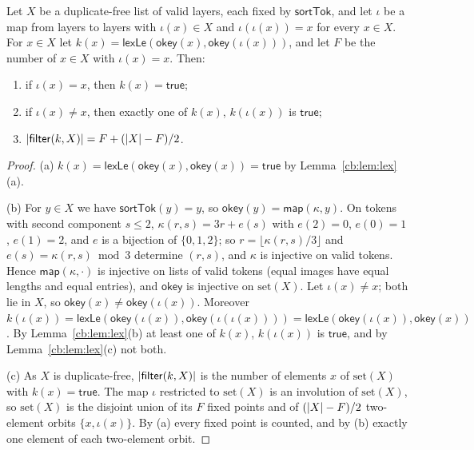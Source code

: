 \begin{lemma}\label{cb:lem:orbits}
Let $X$ be a duplicate-free list of valid layers, each fixed by $\mathsf{sortTok}$, and let $\iota$ be a map from
layers to layers with $\iota(x)\in X$ and $\iota(\iota(x))=x$ for every $x\in X$. For $x\in X$ let
$k(x)=\mathsf{lexLe}(\mathsf{okey}(x),\mathsf{okey}(\iota(x)))$, and let $F$ be the number of $x\in X$ with
$\iota(x)=x$. Then:
\begin{enumerate}[label=(\alph*)]
\item if $\iota(x)=x$, then $k(x)=\mathsf{true}$;
\item if $\iota(x)\ne x$, then exactly one of $k(x)$, $k(\iota(x))$ is $\mathsf{true}$;
\item $\lvert\mathsf{filter}(k,X)\rvert=F+(\lvert X\rvert-F)/2$.
\end{enumerate}
\end{lemma}

\begin{proof}
(a) $k(x)=\mathsf{lexLe}(\mathsf{okey}(x),\mathsf{okey}(x))=\mathsf{true}$ by Lemma~\ref{cb:lem:lex}(a).

(b) For $y\in X$ we have $\mathsf{sortTok}(y)=y$, so $\mathsf{okey}(y)=\mathsf{map}(\kappa,y)$. On tokens with second
component $s\le2$, $\kappa(r,s)=3r+e(s)$ with $e(2)=0$, $e(0)=1$, $e(1)=2$, and $e$ is a bijection of $\{0,1,2\}$;
so $r=\lfloor\kappa(r,s)/3\rfloor$ and $e(s)=\kappa(r,s)\bmod3$ determine $(r,s)$, and $\kappa$ is injective on valid
tokens. Hence $\mathsf{map}(\kappa,\cdot)$ is injective on lists of valid tokens (equal images have equal lengths and
equal entries), and $\mathsf{okey}$ is injective on $\mathrm{set}(X)$. Let $\iota(x)\ne x$; both lie in $X$, so
$\mathsf{okey}(x)\ne\mathsf{okey}(\iota(x))$. Moreover
$k(\iota(x))=\mathsf{lexLe}(\mathsf{okey}(\iota(x)),\mathsf{okey}(\iota(\iota(x))))
=\mathsf{lexLe}(\mathsf{okey}(\iota(x)),\mathsf{okey}(x))$. By Lemma~\ref{cb:lem:lex}(b) at least one of $k(x)$,
$k(\iota(x))$ is $\mathsf{true}$, and by Lemma~\ref{cb:lem:lex}(c) not both.

(c) As $X$ is duplicate-free, $\lvert\mathsf{filter}(k,X)\rvert$ is the number of elements $x$ of $\mathrm{set}(X)$ with
$k(x)=\mathsf{true}$. The map $\iota$ restricted to $\mathrm{set}(X)$ is an involution of $\mathrm{set}(X)$, so
$\mathrm{set}(X)$ is the disjoint union of its $F$ fixed points and of $(\lvert X\rvert-F)/2$ two-element orbits
$\{x,\iota(x)\}$. By (a) every fixed point is counted, and by (b) exactly one element of each two-element orbit.
\end{proof}

